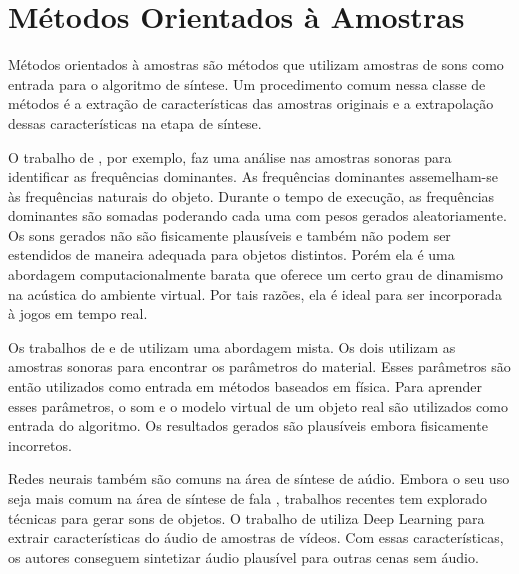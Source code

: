 \section{Métodos Orientados à Amostras}
Métodos orientados à amostras são métodos que utilizam amostras de sons como entrada para o algoritmo de síntese. Um procedimento comum nessa classe de métodos é a extração de características das amostras originais e a extrapolação dessas características na etapa de síntese.

O trabalho de \cite{lloyd2011sound}, por exemplo, faz uma análise nas amostras sonoras para identificar as frequências dominantes. As frequências dominantes assemelham-se às frequências naturais do objeto. Durante o tempo de execução, as frequências dominantes são somadas poderando cada uma com pesos gerados aleatoriamente. Os sons gerados não são fisicamente plausíveis e também não podem ser estendidos de maneira adequada para objetos distintos. Porém ela é uma abordagem computacionalmente barata que oferece um certo grau de dinamismo na acústica do ambiente virtual. Por tais razões, ela é ideal para ser incorporada à jogos em tempo real.

Os trabalhos de \cite{ren2013example} e de \cite{sterling2016interactive} utilizam uma abordagem mista. Os dois utilizam as amostras sonoras para encontrar os parâmetros do material. Esses parâmetros são então utilizados como entrada em métodos baseados em física. Para aprender esses parâmetros, o som e o modelo virtual de um objeto real são utilizados como entrada do algoritmo. Os resultados gerados são plausíveis embora fisicamente incorretos. 

Redes neurais também são comuns na área de síntese de aúdio. Embora o seu uso seja mais comum na área de síntese de fala \cite{rahim1993use, ling2015deep}, trabalhos recentes tem explorado técnicas para gerar sons de objetos. O trabalho de \cite{visualIndicatedSounds} utiliza Deep Learning para extrair características do áudio de amostras de vídeos. Com essas características, os autores conseguem sintetizar áudio plausível para outras cenas sem áudio.

